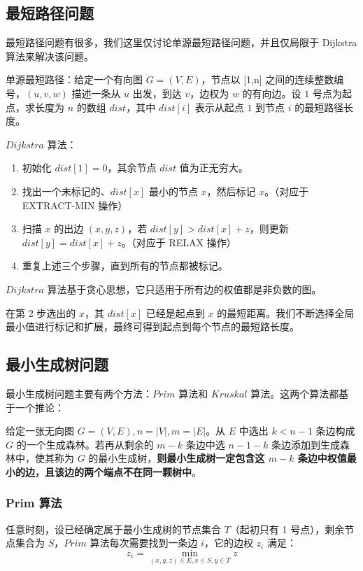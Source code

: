 \documentclass[12pt,a4paper]{article}
\begin{document}
\subsection{最短路径问题}

最短路径问题有很多，我们这里仅讨论单源最短路径问题，并且仅局限于 Dijkstra 算法来解决该问题。

单源最短路径：给定一个有向图 $G=(V, E)$，节点以 [1,n] 之间的连续整数编号，$(u,v,w)$ 描述一条从 $u$ 出发，到达 $v$，边权为 $w$ 的有向边。设 $1$ 号点为起点，求长度为 $n$ 的数组 $dist$，其中 $dist[i]$ 表示从起点 $1$ 到节点 $i$ 的最短路径长度。

$Dijkstra$ 算法：
\begin{enumerate}[itemsep=0 pt]
    \item 初始化 $dist[1] = 0$，其余节点 $dist$ 值为正无穷大。
    \item 找出一个未标记的、$dist[x]$ 最小的节点 $x$，然后标记 $x$。（对应于 EXTRACT-MIN 操作）
    \item 扫描 $x$ 的出边 $(x, y, z)$，若 $dist[y] > dist[x] + z$，则更新 $dist[y] = dist[x] + z$。（对应于 RELAX 操作）
    \item 重复上述三个步骤，直到所有的节点都被标记。
\end{enumerate}

$Dijkstra$ 算法基于贪心思想，它只适用于所有边的权值都是非负数的图。

在第 2 步选出的 $x$，其 $dist[x]$ 已经是起点到 $x$ 的最短距离。我们不断选择全局最小值进行标记和扩展，最终可得到起点到每个节点的最短路长度。

\subsection{最小生成树问题}

最小生成树问题主要有两个方法：$Prim$ 算法和 $Kruskal$ 算法。这两个算法都基于一个推论：

给定一张无向图 $G=(V,E),n = |V|, m = |E|$。从 $E$ 中选出 $k < n-1$ 条边构成 $G$ 的一个生成森林。若再从剩余的 $m-k$ 条边中选 $n-1-k$ 条边添加到生成森林中，使其称为 $G$ 的最小生成树，\textbf{则最小生成树一定包含这 $m-k$ 条边中权值最小的边，且该边的两个端点不在同一颗树中}。

\subsubsection{Prim 算法}

任意时刻，设已经确定属于最小生成树的节点集合 $T$（起初只有 1 号点），剩余节点集合为 $S$，$Prim$ 算法每次需要找到一条边 $i$，它的边权 $z_i$ 满足：
$$z_i = \min_{(x,y,z) \in E, x\in S, y\in T}z$$
\end{document}
